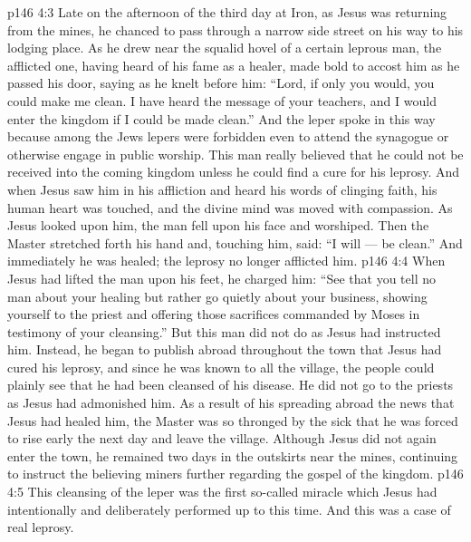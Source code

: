 \vs p146 4:3 \pc Late on the afternoon of the third day at Iron, as Jesus was returning from the mines, he chanced to pass through a narrow side street on his way to his lodging place. As he drew near the squalid hovel of a certain leprous man, the afflicted one, having heard of his fame as a healer, made bold to accost him as he passed his door, saying as he knelt before him: “Lord, if only you would, you could make me clean. I have heard the message of your teachers, and I would enter the kingdom if I could be made clean.” And the leper spoke in this way because among the Jews lepers were forbidden even to attend the synagogue or otherwise engage in public worship. This man really believed that he could not be received into the coming kingdom unless he could find a cure for his leprosy. And when Jesus saw him in his affliction and heard his words of clinging faith, his human heart was touched, and the divine mind was moved with compassion. As Jesus looked upon him, the man fell upon his face and worshiped. Then the Master stretched forth his hand and, touching him, said: \textcolor{ubdarkred}{“I will --- be clean.”} And immediately he was healed; the leprosy no longer afflicted him.
\vs p146 4:4 When Jesus had lifted the man upon his feet, he charged him: \textcolor{ubdarkred}{“See that you tell no man about your healing but rather go quietly about your business, showing yourself to the priest and offering those sacrifices commanded by Moses in testimony of your cleansing.”} But this man did not do as Jesus had instructed him. Instead, he began to publish abroad throughout the town that Jesus had cured his leprosy, and since he was known to all the village, the people could plainly see that he had been cleansed of his disease. He did not go to the priests as Jesus had admonished him. As a result of his spreading abroad the news that Jesus had healed him, the Master was so thronged by the sick that he was forced to rise early the next day and leave the village. Although Jesus did not again enter the town, he remained two days in the outskirts near the mines, continuing to instruct the believing miners further regarding the gospel of the kingdom.
\vs p146 4:5 This cleansing of the leper was the first so\hyp{}called miracle which Jesus had intentionally and deliberately performed up to this time. And this was a case of real leprosy.

